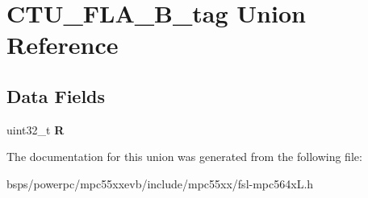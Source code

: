 \hypertarget{unionCTU__FLA__32B__tag}{}\section{C\+T\+U\+\_\+\+F\+L\+A\+\_\+B\+\_\+tag Union Reference}
\label{unionCTU__FLA__32B__tag}
\subsection*{Data Fields}
\begin{DoxyCompactItemize}
\item 
\mbox{\label{unionCTU__FLA__32B__tag_abd0a78eefa8ebe439e726df0d3fe4b3c}} 
uint32\+\_\+t {\bfseries R}
\end{DoxyCompactItemize}


The documentation for this union was generated from the following file\+:\begin{DoxyCompactItemize}
\item 
bsps/powerpc/mpc55xxevb/include/mpc55xx/fsl-\/mpc564x\+L.\+h\end{DoxyCompactItemize}
